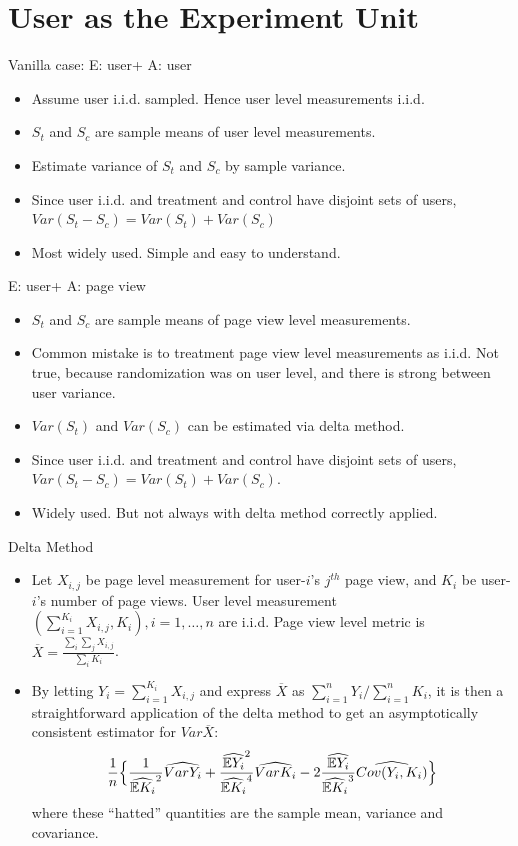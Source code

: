 \documentclass[xcolor=x11names,table]{beamer}
\newcommand{\bbe}{\mathbb{E}}
\newcommand{\wht}{\widehat}
\newcommand{\var}{Var}
\newcommand{\xbar}{\overline{X}}
\begin{document}
\section{User as the Experiment Unit}
\begin{frame}{Vanilla case: E: user+ A: user}
\begin{itemize}
\item Assume user i.i.d. sampled.  Hence user level measurements i.i.d.
\item $S_t$ and $S_c$ are sample means of user level measurements. 
\item Estimate variance of $S_t$ and $S_c$ by sample variance.
\item Since user i.i.d. and treatment and control have disjoint sets of users, $Var(S_t-S_c)=Var(S_t)+Var(S_c)$
\item Most widely used. Simple and easy to understand. 
\end{itemize}

\end{frame}

\begin{frame}{ E: user+ A: page view}
\begin{itemize}
\item $S_t$ and $S_c$ are sample means of page view level measurements. 
\item Common mistake is to treatment page view level measurements as i.i.d. Not true, because randomization was on user level, and there is strong between user variance. 
\item $Var(S_t)$ and $Var(S_c)$ can be estimated via delta method. 
\item Since user i.i.d. and treatment and control have disjoint sets of users, $Var(S_t-S_c)=Var(S_t)+Var(S_c)$. 
\item Widely used. But not always with delta method correctly applied. 
\end{itemize}
\end{frame}

\begin{frame}{Delta Method}
\begin{itemize}
\item Let $X_{i,j}$ be page level measurement for user-$i$'s $j^{th}$ page view, and $K_i$ be user-$i$'s number of page views.  User level measurement $(\sum_{i=1}^{K_i} X_{i,j}, K_i),i=1,\dots,n$ are i.i.d. Page view level metric is $\xbar=\frac{\sum_i \sum _j X_{i,j}}{\sum_i K_i}$.
\item  By letting $Y_i = \sum_{i=1}^{K_i} X_{i,j}$ and express $\xbar$ as $\sum_{i=1}^n Y_i / \sum_{i=1}^n K_i$, it is then a straightforward application of the delta method to get an asymptotically consistent estimator for $\var \xbar$:
\begin{align*}
\frac{1}{n} \Bigl\{ \frac{1}{\wht{\bbe K_i}^2}\wht{\var Y_i} + \frac{\wht{\bbe Y_i}^2}{\wht{\bbe K_i}^4}\wht{\var K_i} - 2\frac{\wht{\bbe Y_i}}{\wht{\bbe K_i}^3} \wht{Cov(Y_i,K_i)} \Bigr\} 
\end{align*}
where these ``hatted'' quantities are the sample mean, variance and covariance. 
\end{itemize}
\end{frame}
\end{document}

